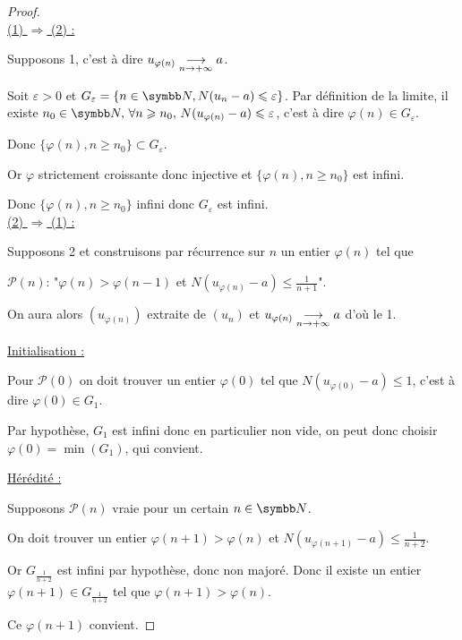 
\begin{proof}~\\
    \uline{(1) $\Rightarrow$ (2) :}

    Supposons 1, c'est à dire $u_{\varphi(n)} \underset{n \to +\infty}{\longrightarrow} a$.

    Soit $\varepsilon > 0$ et $G_\varepsilon = \{n \in \N, N(u_n - a) \leqslant \varepsilon\}$.
    Par définition de la limite, il existe $n_0 \in \N, \, \forall n \geqslant n_0, \, N(u_{\varphi(n)} - a) \leqslant \varepsilon$, 
    c'est à dire $\varphi(n) \in G_\varepsilon$.

    Donc $\{\varphi(n), n \geqslant n_0\} \subset G_\varepsilon$.

    Or $\varphi$ strictement croissante donc injective et $\{\varphi(n), n \geqslant n_0\}$ est infini.
    
    Donc $\{\varphi(n), n \geqslant n_0\}$ infini donc $G_\varepsilon$ est infini.\\
    
    \uline{(2) $\Rightarrow$ (1) :}

    Supposons 2 et construisons par récurrence sur $n$ un entier $\varphi(n)$ tel que

    $\mathscr P(n)$: "$\varphi(n) > \varphi(n - 1)$ et $N(u_{\varphi(n)} - a) \leqslant \frac 1 {n + 1}$".

    On aura alors $(u_{\varphi(n)})$ extraite de $(u_n)$ et $u_{\varphi(n)} \underset{n \to +\infty}{\longrightarrow} a$
    d'où le 1. 

    \quad \uline{Initialisation :}

    \svspace Pour $\mathscr P(0)$ on doit trouver un entier $\varphi(0)$ tel que
    $N(u_{\varphi(0)} - a) \leqslant 1$, c'est à dire $\varphi(0) \in G_1$.

    Par hypothèse, $G_1$ est infini donc en particulier non vide, on peut donc 
    choisir $\varphi(0)  = \min(G_1)$, qui convient. 

    \quad \uline{Hérédité :}

    \svspace Supposons $\mathscr P(n)$ vraie pour un certain $n \in \N$.

    On doit trouver un entier $\varphi(n+1) > \varphi(n)$ et 
    $N(u_{\varphi(n + 1)} - a) \leqslant \frac 1 {n + 2}$. 

    Or $G_{\frac 1 {n + 2}}$ est infini par hypothèse, donc non majoré. Donc il existe
    un entier $\varphi(n + 1) \in G_{\frac 1 {n + 2}}$ tel que $\varphi(n + 1) > \varphi(n)$.

    Ce $\varphi(n + 1)$ convient.
\end{proof}

